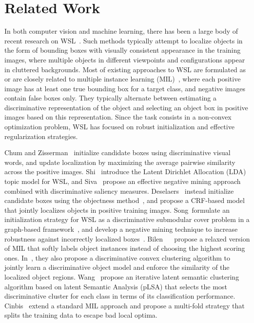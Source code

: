 \documentclass[runningheads]{llncs}
\begin{document}
\section{Related Work}

In both computer vision and machine learning, there has been a large body of recent research on WSL~\cite{Anonymous:2007fd,shi2012transfer,siva2012defence,Deselaers:2012ci,Siva2013,song2014learning,song14slsvm,bilen2014weakly,bilen2015weakly,Wang:2014tg,Cinbis:2015wn,Oquab:2015us,Bilen:2015uo,Jaderberg:2015vo,Zhou:2015wx}. 
Such methods typically attempt
to localize objects in the form of bounding boxes with visually consistent
appearance in the training images, where multiple objects in different viewpoints
and configurations appear in cluttered backgrounds.  Most of existing approaches
to WSL are formulated as or are closely related to multiple instance learning
(MIL)~\cite{long1998pac}, where each positive image has at least one true
bounding box for a target class, and negative images contain false boxes only.
They typically alternate between
estimating a discriminative representation of the object and selecting an object
box in positive images based on this representation. Since the task consists
in a non-convex optimization problem, WSL has focused on robust initialization
and effective regularization strategies. 

Chum and Zisserman~\cite{Anonymous:2007fd} initialize candidate boxes 
using discriminative visual words, and  update localization by maximizing
the average pairwise similarity across the positive images.
Shi~\etal\cite{shi2012transfer} introduce  %
the Latent Dirichlet Allocation (LDA) topic model for WSL, and 
Siva~\etal\cite{siva2012defence}%
propose an effective negative mining approach combined
with discriminative saliency measures.  Deselaers~\etal\cite{Deselaers:2012ci} instead
initialize candidate boxes using the objectness method~\cite{Anonymous:2012kg}, 
and %
propose a CRF-based model that jointly localizes objects in positive training
images. %
Song~\etal formulate 
an initialization strategy for WSL as a discriminative submodular cover problem in
a graph-based framework~\cite{song2014learning}, and develop a negative mining technique to increase robustness against incorrectly localized boxes~\cite{song14slsvm}.  Bilen~\etal
~\cite{bilen2014weakly} propose a relaxed version of MIL that softly
labels object instances instead of choosing the highest scoring ones.
In~\cite{bilen2015weakly}, they also propose a discriminative convex clustering
algorithm to jointly learn a discriminative object model and enforce the
similarity of the localized object regions.
Wang~\etal\cite{Wang:2014tg} propose an iterative latent semantic
clustering algorithm based on latent Semantic Analysis (pLSA) that 
selects the most discriminative cluster for each class in terms of its
classification performance. 
Cinbis~\etal\cite{Cinbis:2015wn} extend a standard MIL approach and propose a
multi-fold strategy that splits the training data to escape bad local optima. 
\end{document}
